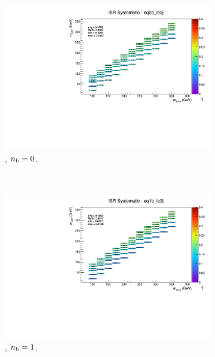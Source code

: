 \begin{figure}[ht!]
  \begin{subfigure}[b]{0.32\textwidth}
    \includegraphics[width=\textwidth, page=1]{Figs/sms/t2cc/v37_3/systs/T2cc_ISR_eq0b_le3j.pdf}
    \caption{\njlow, $n_{\text{b}} = 0$.}
  \end{subfigure}\\
  \begin{subfigure}[b]{0.32\textwidth}
    \includegraphics[width=\textwidth, page=14]{Figs/sms/t2cc/v37_3/systs/T2cc_ISR_eq1b_le3j.pdf}
    \caption{\njlow, $n_{\text{b}} = 1$.}
  \end{subfigure}
  \begin{subfigure}[b]{0.32\textwidth}

\end{subfigure}
\end{figure}
